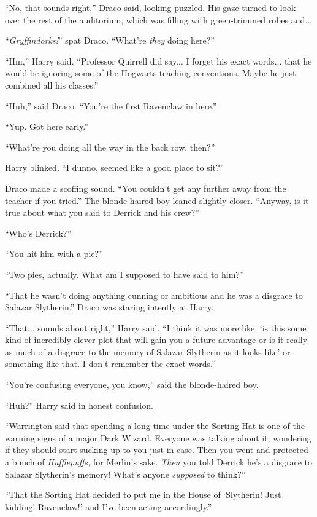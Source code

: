 ``No, that sounds right,'' Draco said, looking puzzled. His gaze turned to look over the rest of the auditorium, which was filling with green-trimmed robes and...

``\emph{Gryffindorks!}'' spat Draco. ``What're \emph{they} doing here?''

``Hm,'' Harry said. ``Professor Quirrell did say... I forget his exact words... that he would be ignoring some of the Hogwarts teaching conventions. Maybe he just combined all his classes.''

``Huh,'' said Draco. ``You're the first Ravenclaw in here.''

``Yup. Got here early.''

``What're you doing all the way in the back row, then?''

Harry blinked. ``I dunno, seemed like a good place to sit?''

Draco made a scoffing sound. ``You couldn't get any further away from the teacher if you tried.'' The blonde-haired boy leaned slightly closer. ``Anyway, is it true about what you said to Derrick and his crew?''

``Who's Derrick?''

``You hit him with a pie?''

``Two pies, actually. What am I supposed to have said to him?''

``That he wasn't doing anything cunning or ambitious and he was a disgrace to Salazar Slytherin.'' Draco was staring intently at Harry.

``That... sounds about right,'' Harry said. ``I think it was more like, `is this some kind of incredibly clever plot that will gain you a future advantage or is it really as much of a disgrace to the memory of Salazar Slytherin as it looks like' or something like that. I don't remember the exact words.''

``You're confusing everyone, you know,'' said the blonde-haired boy.

``Huh?'' Harry said in honest confusion.

``Warrington said that spending a long time under the Sorting Hat is one of the warning signs of a major Dark Wizard. Everyone was talking about it, wondering if they should start sucking up to you just in case. Then you went and protected a bunch of \emph{Hufflepuffs,} for Merlin's sake. \emph{Then} you told Derrick he's a disgrace to Salazar Slytherin's memory! What's anyone \emph{supposed} to think?''

``That the Sorting Hat decided to put me in the House of `Slytherin! Just kidding! Ravenclaw!' and I've been acting accordingly.''

